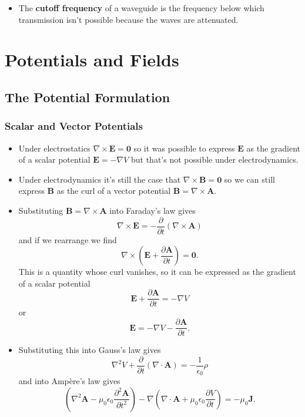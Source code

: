 \documentclass{article}
\renewcommand{\vec}[1]{\boldsymbol{\mathbf{#1}}}
\begin{document}
\begin{itemize}
  \item The \textbf{cutoff frequency} of a waveguide is the frequency below which transmission isn't possible because the waves are attenuated.
\end{itemize}

\section{Potentials and Fields}

\subsection{The Potential Formulation}

\subsubsection{Scalar and Vector Potentials}

\begin{itemize}
  \item Under electrostatics $\nabla \times \vec{E} = \vec{0}$ so it was possible to express $\vec{E}$ as the gradient of a scalar potential $\vec{E} = -\nabla V$ but that's not possible under electrodynamics.

  \item Under electrodynamics it's still the case that $\nabla \times \vec{B} = \vec{0}$ so we can still express $\vec{B}$ as the curl of a vector potential $\vec{B} = \nabla \times \vec{A}$.

  \item Substituting $\vec{B} = \nabla \times \vec{A}$ into Faraday's law gives \[\nabla \times \vec{E} = -\frac{\partial}{\partial t} (\nabla \times \vec{A})\] and if we rearrange we find \[\nabla \times \left( \vec{E} + \frac{\partial \vec{A}}{\partial t} \right) = \vec{0}.\] This is a quantity whose curl vanishes, so it can be expressed as the gradient of a scalar potential \[\vec{E} + \frac{\partial \vec{A}}{\partial t} = -\nabla V\] or \[\vec{E} = -\nabla V - \frac{\partial \vec{A}}{\partial t}.\]

  \item Substituting this into Gauss's law gives \[\nabla^2 V + \frac{\partial}{\partial t} (\nabla \cdot \vec{A}) = -\frac{1}{\epsilon_0} \rho\] and into Ampère's law gives \[\left( \nabla^2 \vec{A} - \mu_0 \epsilon_0 \frac{\partial^2 \vec{A}}{\partial t^2} \right) - \nabla \left( \nabla \cdot \vec{A} + \mu_0 \epsilon_0 \frac{\partial V}{\partial t} \right) = -\mu_0 \vec{J}.\]
\end{itemize}
\end{document}
